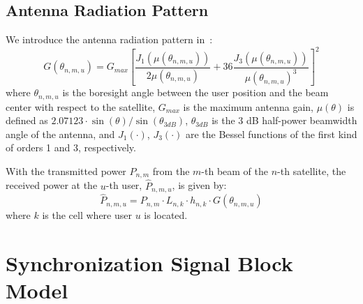 \subsection{Antenna Radiation Pattern}
We introduce the antenna radiation pattern in~\cite{Energy-Efficient}:
\begin{equation}
    G(\theta_{n,m,u}) = G_{max} \left[ \frac{J_1\left(\mu(\theta_{n,m,u})\right)}{2\mu(\theta_{n,m,u})}
    + 36 \frac{J_3\left(\mu(\theta_{n,m,u})\right)}{\mu(\theta_{n,m,u})^3} \right]^2
\end{equation}
where $\theta_{n,m,u}$ is the boresight angle between the user position and the beam center with respect to the satellite, $G_{max}$ is the maximum antenna gain, $\mu(\theta)$ is defined as $2.07123 \cdot \sin(\theta)/\sin(\theta_{3dB})$, $\theta_{3dB}$ is the 3 dB half-power beamwidth angle of the antenna, and $J_1(\cdot)$, $J_3(\cdot)$ are the Bessel functions of the first kind of orders 1 and 3, respectively.

With the transmitted power $P_{n,m}$ from the $m$-th beam of the $n$-th satellite, the received power at the $u$-th user, $\hat{P}_{n,m,u}$, is given by:
\begin{equation}
    \hat{P}_{n,m,u} = P_{n,m} \cdot L_{n,k} \cdot h_{n,k} \cdot G(\theta_{n,m,u})
\end{equation}
where $k$ is the cell where user $u$ is located.

\section{Synchronization Signal Block Model}




